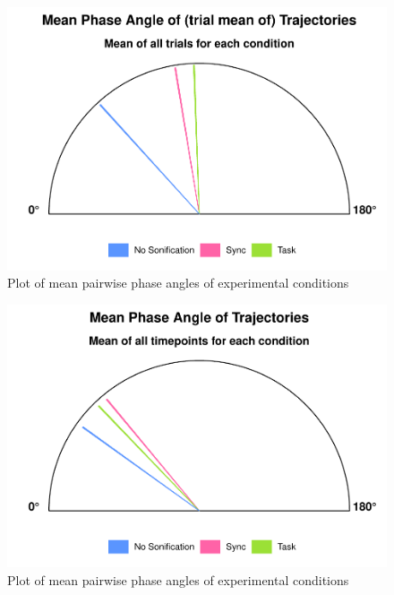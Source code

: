 \documentclass[10pt,a4paper,onecolumn]{article}
\begin{document}
\begin{figure}

{\centering \includegraphics[width=1\linewidth]{CogSci_Bachelor_Thesis_files/figure-latex/mean-instantaneous-phase-angle-circular-plot-1} 

}

\caption{Plot of mean pairwise phase angles of experimental conditions}\label{fig:mean-instantaneous-phase-angle-circular-plot-1}
\end{figure}
\begin{figure}

{\centering \includegraphics[width=1\linewidth]{CogSci_Bachelor_Thesis_files/figure-latex/mean-instantaneous-phase-angle-circular-plot-2} 

}

\caption{Plot of mean pairwise phase angles of experimental conditions}\label{fig:mean-instantaneous-phase-angle-circular-plot-2}
\end{figure}
\end{document}
